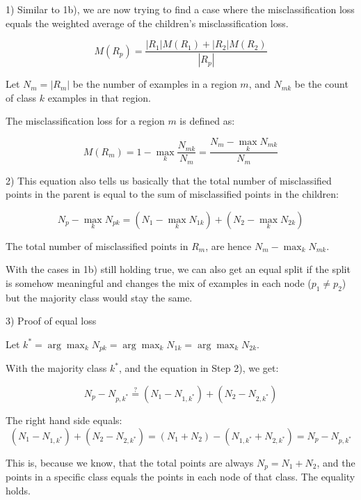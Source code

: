\begin{answer}
    1) Similar to 1b), we are now trying to find a case where the misclassification loss equals the weighted average of the children's misclassification loss.

    $$M(R_p) = \frac{|R_1|M(R_1) + |R_2|M(R_2)}{|R_p|}$$

    Let $N_m = |R_m|$ be the number of examples in a region $m$, and $N_{mk}$ be the count of class $k$ examples in that region.

    The misclassification loss for a region $m$ is defined as:

    $$M(R_m) = 1 - \max_k \frac{N_{mk}}{N_m} = \frac{N_m - \max_k N_{mk}}{N_m}$$

    2) This equation also tells us basically that the total number of misclassified points in the parent is equal to the sum of misclassified points in the children:

    $$N_p - \max_k N_{pk} = (N_1 - \max_k N_{1k}) + (N_2 - \max_k N_{2k})$$

    The total number of misclassified points in $R_m$, are hence $N_m - \max_k N_{mk}$.

    With the cases in 1b) still holding true, we can also get an equal split if the split is somehow meaningful and changes the mix of examples in each node ($p_1 \neq p_2$) but the majority class would stay the same. 

    3) Proof of equal loss

    Let $k^* = \arg\max_k N_{pk} = \arg\max_k N_{1k} = \arg\max_k N_{2k}$.

    With the majority class $k^*$, and the equation in Step 2), we get:

    $$N_p - N_{p,k^*} \stackrel{?}{=} (N_1 - N_{1,k^*}) + (N_2 - N_{2,k^*})$$

    The right hand side equals:
    $$(N_1 - N_{1,k^*}) + (N_2 - N_{2,k^*}) = (N_1 + N_2) - (N_{1,k^*} + N_{2,k^*}) = N_p - N_{p,k^*}$$

    This is, because we know, that the total points are always $N_p = N_1 + N_2$, and the points in a specific class equals the points in each node of that class. The equality holds.
\end{answer}